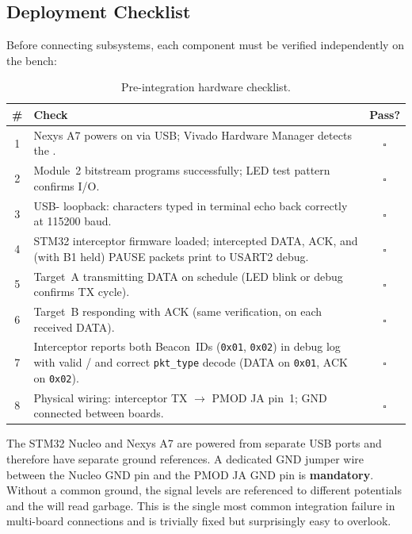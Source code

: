 \documentclass[11pt,letterpaper]{article}
\begin{document}
	\subsection{Deployment Checklist}

	Before connecting subsystems, each component must be verified independently on the bench:

	\begin{table}[ht!]
		\centering
		\caption{Pre-integration hardware checklist.}
		\label{tab:checklist}
		\renewcommand{\arraystretch}{1.3}
		\begin{tabularx}{\textwidth}{c X c}
			\toprule
			\textbf{\#} & \textbf{Check} & \textbf{Pass?} \\
			\midrule
			1 & Nexys A7 powers on via USB; Vivado Hardware Manager detects the \FPGA{}. & $\square$ \\
			2 & Module~2 bitstream programs successfully; LED test pattern confirms I/O. & $\square$ \\
			3 & \FPGA{} USB-\UART{} loopback: characters typed in terminal echo back correctly at 115200 baud. & $\square$ \\
			4 & STM32 interceptor firmware loaded; intercepted DATA, ACK, and (with B1 held) PAUSE packets print to USART2 debug. & $\square$ \\
			5 & Target~A transmitting DATA on schedule (LED blink or debug \UART{} confirms TX cycle). & $\square$ \\
			6 & Target~B responding with ACK (same verification, on each received DATA). & $\square$ \\
			7 & Interceptor reports both Beacon~IDs (\texttt{0x01}, \texttt{0x02}) in debug log with valid \RSSI{}/\SNR{} and correct \texttt{pkt\_type} decode (DATA on \texttt{0x01}, ACK on \texttt{0x02}). & $\square$ \\
			8 & Physical wiring: interceptor \UART{} TX $\rightarrow$ PMOD JA pin~1; GND connected between boards. & $\square$ \\
			\bottomrule
		\end{tabularx}
	\end{table}

	\begin{tcolorbox}[warning={Critical: Common Ground}]
		The STM32 Nucleo and Nexys A7 are powered from separate USB ports and therefore have separate ground references. A dedicated GND jumper wire between the Nucleo GND pin and the PMOD JA GND pin is \textbf{mandatory}. Without a common ground, the \UART{} signal levels are referenced to different potentials and the \FPGA{} will read garbage. This is the single most common integration failure in multi-board \UART{} connections and is trivially fixed but surprisingly easy to overlook.
	\end{tcolorbox}
\end{document}

